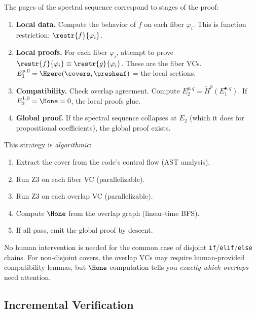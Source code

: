 \begin{definition}
The pages of the spectral sequence correspond to stages of the
proof:
\begin{enumerate}
\item[$E_0$:] \textbf{Local data.}
  Compute the behavior of $f$ on each fiber $\varphi_i$.
  This is function restriction: $\restr{f}{\varphi_i}$.

\item[$E_1$:] \textbf{Local proofs.}
  For each fiber $\varphi_i$, attempt to prove
  $\restr{f}{\varphi_i} \equiv \restr{g}{\varphi_i}$.
  These are the fiber VCs.
  $E_1^{p,0} = \Hzero(\covers, \presheaf)$ = the local sections.

\item[$E_2$:] \textbf{Compatibility.}
  Check overlap agreement.  Compute
  $E_2^{p,q} = \check{H}^p(E_1^{\bullet, q})$.
  If $E_2^{1,0} = \Hone = 0$, the local proofs glue.

\item[$E_\infty$:] \textbf{Global proof.}
  If the spectral sequence collapses at $E_2$ (which it does
  for propositional coefficients), the global proof exists.
\end{enumerate}
\end{definition}

\begin{remark}
This strategy is \emph{algorithmic}:
\begin{enumerate}
\item Extract the cover from the code's control flow (AST analysis).
\item Run Z3 on each fiber VC (parallelizable).
\item Run Z3 on each overlap VC (parallelizable).
\item Compute $\Hone$ from the overlap graph (linear-time BFS).
\item If all pass, emit the global proof by descent.
\end{enumerate}
No human intervention is needed for the common case of disjoint
\texttt{if}/\texttt{elif}/\texttt{else} chains.  For non-disjoint
covers, the overlap VCs may require human-provided compatibility
lemmas, but $\Hone$ computation tells you \emph{exactly which
overlaps} need attention.
\end{remark}


\subsection{Incremental Verification}
\label{sec:incremental}

